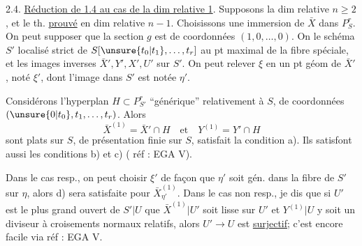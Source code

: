 2.4. \uline{Réduction de 1.4 au cas de la dim relative 1}.
Supposons la dim relative $n\geq2$, et le th. \uline{prouvé} en dim relative $n-1$.
Choisissons une immersion de $\bar X$ dans $P_S^r$.  On peut supposer que la section $g$ est de coordonnées $(1,0,\ldots,0)$. On  le schéma  $S'$ localisé strict de $S[\unsure{t_0|t_1},\ldots,t_r]$ au pt maximal de la fibre spéciale, et les images inverses \deleted{\unsure{$\xi$}} $\bar X',Y',X',U'$ sur $S'$. On peut relever $\xi$ en un pt géom de $\bar X'$,  noté $\xi'$, dont l'image dans $S'$  est notée $\eta'$.


Considérons  l'hyperplan $H\subset P_{S'}^r$ ``générique''  relativement à $S$, de coordonnées $(\unsure{0|t_0},t_1,\ldots,t_r)$.  Alors  
\[
\bar X^{(1)}=\bar X'\cap H\quad\text{et}\quad Y^{(1)}=Y'\cap H
\]
sont  plats sur $S$, de présentation finie sur $S$,    satisfait la condition a). Ils satisfont aussi les conditions b) et c) ( réf : EGA V).

Dans le cas resp., on peut choisir $\xi'$ de façon que $\eta'$ soit gén. dans la fibre de $S'$ sur $\eta$, alors d) sera satisfaite pour $\bar X^{(1)}_{\eta'}$. Dans le cas non resp.,  je dis que si $U'$ est le plus grand ouvert de $S'|U$   que $\bar X^{(1)}|U'$ soit lisse sur $U'$ et $Y^{(1)}|U$ y soit un diviseur à croisements normaux relatifs, alors $U'\to U$ est \uline{surjectif};  c'est encore facile via réf : EGA V.
